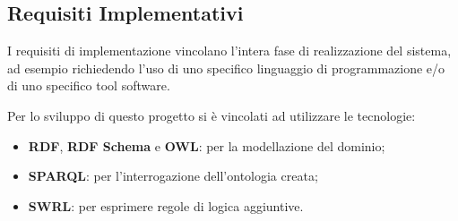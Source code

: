 \subsection{Requisiti Implementativi}

I requisiti di implementazione vincolano l’intera fase di realizzazione del sistema, ad esempio richiedendo l’uso di uno specifico linguaggio di programmazione e/o di uno specifico tool software.

\noindent Per lo sviluppo di questo progetto si è vincolati ad utilizzare le tecnologie:
\begin{itemize}
	\item \textbf{RDF}, \textbf{RDF Schema} e \textbf{OWL}: per la modellazione del dominio;
	\item \textbf{SPARQL}: per l'interrogazione dell'ontologia creata;
	\item \textbf{SWRL}: per esprimere regole di logica aggiuntive.
\end{itemize}
